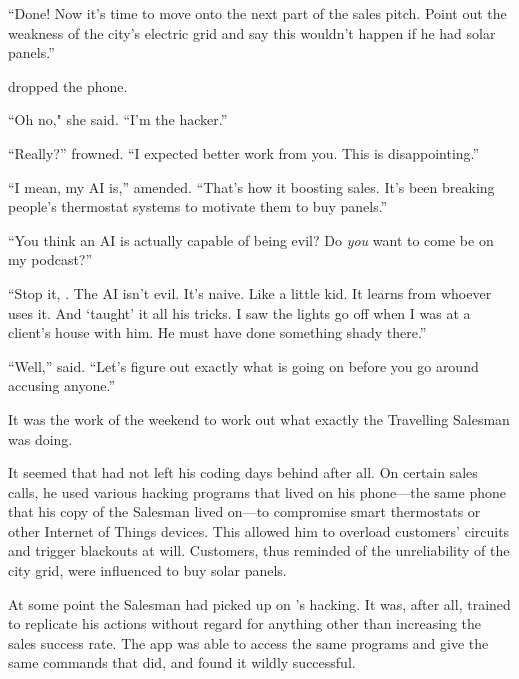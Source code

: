 ``Done! Now it's time to move onto the next part of the sales pitch. Point out the weakness of the city’s electric grid and say this wouldn't happen if he had solar panels.''

{\protag} dropped the phone.

``Oh no," she said. ``I’m the hacker.''

``Really?'' {\sidetag} frowned. ``I expected better work from you. This is disappointing.''


``I mean, my AI is,'' {\protag} amended. ``That’s how it boosting sales. It's been breaking people’s thermostat systems to motivate them to buy panels.''

``You think an AI is actually capable of being evil? Do \emph{you} want to come be on my podcast?''

``Stop it, {\sidetag}. The AI isn't evil. It's naive. Like a little kid. It learns from whoever uses it. And \energyJerk{} `taught' it all his tricks. I saw the lights go off when I was at a client's house with him. He must have done something shady there.''

``Well,” {\sidetag} said. ``Let's figure out exactly what is going on before you go around accusing anyone.''

It was the work of the weekend to work out what exactly the Travelling Salesman was doing.

It seemed that \energyJerk{} had not left his coding days behind after all. On certain sales calls, he used various hacking programs that lived on his phone---the same phone that his copy of the Salesman lived on---to compromise smart thermostats or other Internet of Things devices. This allowed him to overload customers' circuits and trigger blackouts at will. Customers, thus reminded of the unreliability of the city grid, were influenced to buy solar panels.


At some point the Salesman had picked up on \energyJerk{}'s hacking. It was, after all, trained to replicate his actions without regard for anything other than increasing the sales success rate. The app was able to access the same programs and give the same commands that \energyJerk{} did, and found it wildly successful.

